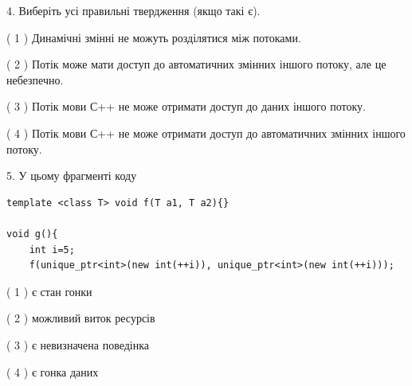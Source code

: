 \documentclass[12pt, ukrainian]{article}
\begin{document}
\begin {large}
{%
4. Виберіть усі правильні твердження (якщо такі є).\par
\vspace{2mm}

( 1 ) Динамічні змінні не можуть розділятися між потоками.%

( 2 ) Потік може мати доступ до автоматичних змінних іншого потоку, але це небезпечно.%

( 3 ) Потік мови С++ не може отримати доступ до даних іншого потоку.%

( 4 ) Потік мови С++ не може отримати доступ до автоматичних змінних іншого потоку.%


5. У цьому фрагменті коду
\begin{verbatim}
template <class T> void f(T a1, T a2){}

void g(){
    int i=5;
    f(unique_ptr<int>(new int(++i)), unique_ptr<int>(new int(++i)));
\end{verbatim}

( 1 ) є стан гонки%

( 2 ) можливий виток ресурсів%

( 3 ) є невизначена поведінка%

( 4 ) є гонка даних%
}
\end {large}
\end{document}
